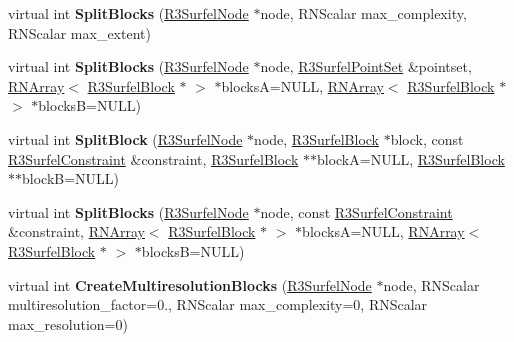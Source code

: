 \begin{DoxyCompactItemize}
\item 
virtual int {\bfseries Split\+Blocks} (\hyperlink{class_r3_surfel_node}{R3\+Surfel\+Node} $\ast$node, R\+N\+Scalar max\+\_\+complexity, R\+N\+Scalar max\+\_\+extent)\hypertarget{class_r3_surfel_tree_a8d10bbefe220c1706f38f12ee126a2b1}{}\label{class_r3_surfel_tree_a8d10bbefe220c1706f38f12ee126a2b1}

\item 
virtual int {\bfseries Split\+Blocks} (\hyperlink{class_r3_surfel_node}{R3\+Surfel\+Node} $\ast$node, \hyperlink{class_r3_surfel_point_set}{R3\+Surfel\+Point\+Set} \&pointset, \hyperlink{class_r_n_array}{R\+N\+Array}$<$ \hyperlink{class_r3_surfel_block}{R3\+Surfel\+Block} $\ast$ $>$ $\ast$blocksA=N\+U\+LL, \hyperlink{class_r_n_array}{R\+N\+Array}$<$ \hyperlink{class_r3_surfel_block}{R3\+Surfel\+Block} $\ast$ $>$ $\ast$blocksB=N\+U\+LL)\hypertarget{class_r3_surfel_tree_a23e873aac8d09da7708b1d2c22edc2cf}{}\label{class_r3_surfel_tree_a23e873aac8d09da7708b1d2c22edc2cf}

\item 
virtual int {\bfseries Split\+Block} (\hyperlink{class_r3_surfel_node}{R3\+Surfel\+Node} $\ast$node, \hyperlink{class_r3_surfel_block}{R3\+Surfel\+Block} $\ast$block, const \hyperlink{class_r3_surfel_constraint}{R3\+Surfel\+Constraint} \&constraint, \hyperlink{class_r3_surfel_block}{R3\+Surfel\+Block} $\ast$$\ast$blockA=N\+U\+LL, \hyperlink{class_r3_surfel_block}{R3\+Surfel\+Block} $\ast$$\ast$blockB=N\+U\+LL)\hypertarget{class_r3_surfel_tree_a467595048f9a7a738ceddbde9a00ff1a}{}\label{class_r3_surfel_tree_a467595048f9a7a738ceddbde9a00ff1a}

\item 
virtual int {\bfseries Split\+Blocks} (\hyperlink{class_r3_surfel_node}{R3\+Surfel\+Node} $\ast$node, const \hyperlink{class_r3_surfel_constraint}{R3\+Surfel\+Constraint} \&constraint, \hyperlink{class_r_n_array}{R\+N\+Array}$<$ \hyperlink{class_r3_surfel_block}{R3\+Surfel\+Block} $\ast$ $>$ $\ast$blocksA=N\+U\+LL, \hyperlink{class_r_n_array}{R\+N\+Array}$<$ \hyperlink{class_r3_surfel_block}{R3\+Surfel\+Block} $\ast$ $>$ $\ast$blocksB=N\+U\+LL)\hypertarget{class_r3_surfel_tree_acdd80a1807e4d535a506cb39328d6440}{}\label{class_r3_surfel_tree_acdd80a1807e4d535a506cb39328d6440}

\item 
virtual int {\bfseries Create\+Multiresolution\+Blocks} (\hyperlink{class_r3_surfel_node}{R3\+Surfel\+Node} $\ast$node, R\+N\+Scalar multiresolution\+\_\+factor=0., R\+N\+Scalar max\+\_\+complexity=0, R\+N\+Scalar max\+\_\+resolution=0)\hypertarget{class_r3_surfel_tree_a1be496d5944770dbe284046b85a34fcf}{}\label{class_r3_surfel_tree_a1be496d5944770dbe284046b85a34fcf}


\end{DoxyCompactItemize}
